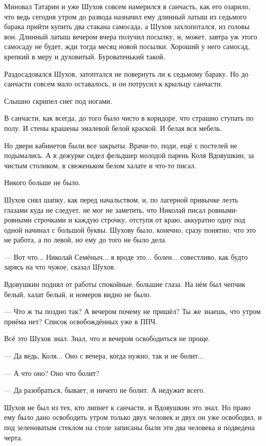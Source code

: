 Миновал Татарин \dash и уже Шухов совсем намерился в санчасть, как его озарило, что ведь сегодня
утром до развода назначил ему длинный латыш из седьмого барака прийти купить два стакана
самосада, а Шухов захлопотался, из головы вон. Длинный латыш вечером вчера получил посылку,
и, может, завтра уж этого самосаду не будет, жди тогда месяц новой посылки. Хороший у него
самосад, крепкий в меру и духовитый. Буроватенький такой.

Раздосадовался Шухов, затоптался \dash не повернуть ли к седьмому бараку. Но до санчасти совсем
мало оставалось, и он потрусил к крыльцу санчасти.

Слышно скрипел снег под ногами.

В санчасти, как всегда, до того было чисто в коридоре, что страшно ступать по полу. И стены
крашены эмалевой белой краской. И белая вся мебель.

Но двери кабинетов были все закрыты. Врачи-то, поди, ещё с постелей не подымались. А в дежурке
сидел фельдшер \dash молодой парень Коля Вдовушкин, за чистым столиком, в свеженьком белом
халате \dash и что-то писал.

Никого больше не было.

Шухов снял шапку, как перед начальством, и, по лагерной привычке лезть глазами куда не
следует, не мог не заметить, что Николай писал ровными-ровными строчками и каждую строчку,
отступя от краю, аккуратно одну под одной начинал с большой буквы. Шухову было, конечно,
сразу понятно, что это \dash не работа, а по левой, но ему до того не было дела.

--- Вот что... Николай Семёныч... я вроде это... болен... \dash совестливо, как будто зарясь на что
чужое, сказал Шухов.

Вдовушкин поднял от работы спокойные, большие глаза. На нём был чепчик белый, халат белый, и
номеров видно не было.

--- Что ж ты поздно так? А вечером почему не пришёл? Ты же знаешь, что утром приёма нет? Список
освобождённых уже в ППЧ.

Всё это Шухов знал. Знал, что и вечером освободиться не проще.

--- Да ведь, Коля... Оно с вечера, когда нужно, так и не болит...

--- А что \dash оно? Оно \dash что болит?

--- Да разобраться, бывает, и ничего не болит. А недужит всего.

Шухов не был из тех, кто липнет к санчасти, и Вдовушкин это знал. Но право ему было дано
освободить утром только двух человек \dash и двух он уже освободил, и под зеленоватым стеклом на
столе записаны были эти два человека и подведена черта.

